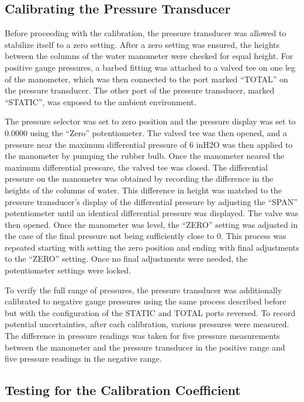 \documentclass[journal,letterpaper]{IEEEtran}
\begin{document}
\subsection{Calibrating the Pressure Transducer}

Before proceeding with the calibration, the pressure transducer was allowed to stabilize itself to a zero setting.
After a zero setting was ensured, the heights between the columns of the water manometer were checked for equal height.
For positive gauge pressures, a barbed fitting was attached to a valved tee on one leg of the manometer, which was then connected to the port marked “TOTAL” on the pressure transducer. 
The other port of the pressure transducer, marked “STATIC”, was exposed to the ambient environment.

The pressure selector was set to zero position and the pressure display was set to 0.0000 using the “Zero” potentiometer.
The valved tee was then opened, and a pressure near the maximum differential pressure of 6 inH2O was then applied to the manometer by pumping the rubber bulb.
Once the manometer neared the maximum differential pressure, the valved tee was closed.
The differential pressure on the manometer was obtained by recording the difference in the heights of the columns of water.
This difference in height was matched to the pressure transducer's display of the differential pressure by adjusting the “SPAN” potentiometer until an identical differential pressure was displayed.
The valve was then opened.
Once the manometer was level, the “ZERO” setting was adjusted in the case of the final pressure not being sufficiently close to 0.
This process was repeated starting with setting the zero position and ending with final adjustments to the “ZERO” setting.
Once no final adjustments were needed, the potentiometer settings were locked. 

To verify the full range of pressures, the pressure transducer was additionally calibrated to negative gauge pressures using the same process described before but with the configuration of the STATIC and TOTAL ports reversed.
To record potential uncertainties, after each calibration, various pressures were measured.
The difference in pressure readings was taken for five pressure measurements between the manometer and the pressure transducer in the positive range and five pressure readings in the negative range.

\subsection{Testing for the Calibration Coefficient}
\end{document}
